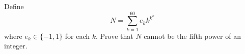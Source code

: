 Define
\[ N=\sum\limits_{k=1}^{60}e_k k^{k^k} \]
where $e_k \in \{-1, 1\}$ for each $k$. Prove that $N$ cannot be the fifth power of an integer.